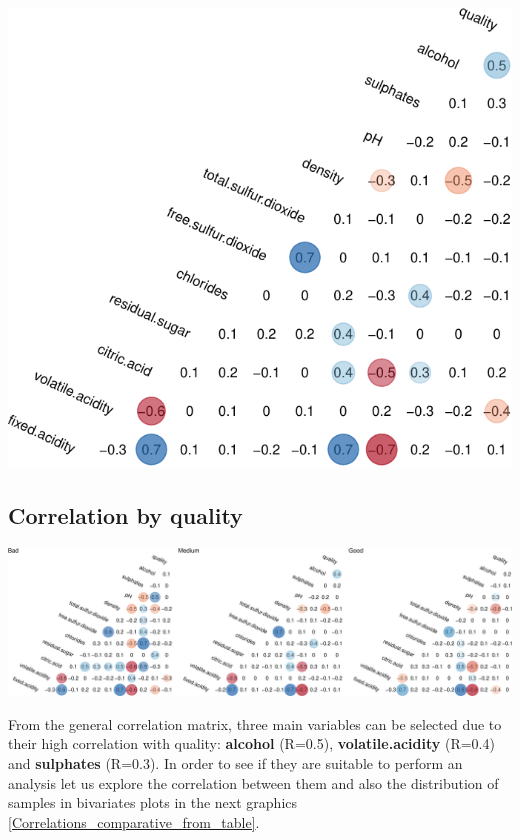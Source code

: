\documentclass[]{article}
\begin{document}
\begin{center}\includegraphics{Figs/Multivariate_Plots_2-1} \end{center}

\subsection{Correlation by quality}\label{correlation-by-quality}

\includegraphics{Figs/unnamed-chunk-2-1.pdf}

From the general correlation matrix, three main variables can be
selected due to their high correlation with quality: \textbf{alcohol}
(R=0.5), \textbf{volatile.acidity} (R=0.4) and \textbf{sulphates}
(R=0.3). In order to see if they are suitable to perform an analysis let
us explore the correlation between them and also the distribution of
samples in bivariates plots in the next graphics
\ref{Correlations_comparative_from_table}.
\end{document}
